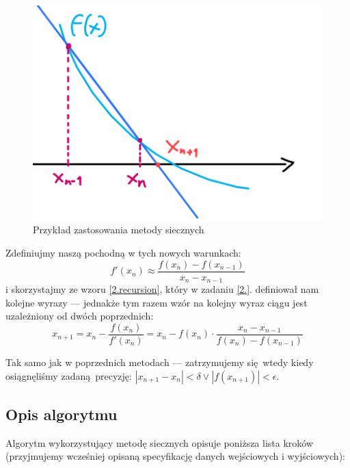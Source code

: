 \documentclass[10pt]{article}
\begin{document}
\begin{figure}[H]
    \centering
    \includegraphics{metoda-siecznych.png}
    \caption{Przykład zastosowania metody siecznych}
\end{figure}

Zdefiniujmy naszą pochodną w tych nowych warunkach:
$$
f'(x_n) \approx \frac{f(x_n) - f(x_{n-1})}{x_n - x_{n-1}}
$$
i skorzystajmy ze wzoru \ref{2.recursion}, który w zadaniu \ref{2.}. definiował nam kolejne wyrazy — jednakże tym razem wzór na kolejny wyraz ciągu jest uzależniony od dwóch poprzednich:
\begin{equation}
    x_{n+1} = x_n - \frac{f(x_n)}{f'(x_n)} = x_n - f(x_n) \cdot \frac{x_n - x_{n-1}}{f(x_n) - f(x_{n-1})}
\end{equation}

Tak samo jak w poprzednich metodach — zatrzymujemy się wtedy kiedy osiągnęliśmy zadaną precyzję: $|x_{n+1} - x_n| < \delta \lor |f(x_{n+1})| < \epsilon$.

\subsection{Opis algorytmu}\label{3.alg}

Algorytm wykorzystujący metodę siecznych opisuje poniższa lista kroków (przyjmujemy wcześniej opisaną specyfikację danych wejściowych i wyjściowych):
\end{document}
